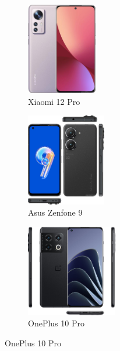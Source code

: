 \documentclass[10pt, UKenglish]{exam}
\begin{document}
\begin{figure}[htpb]
	\begin{subfigure}[htpb]{0.25\linewidth}
	\begin{center}
		\includegraphics[width=\linewidth,height=4cm,keepaspectratio]{xiaomi-12-pro}
	\end{center}
	\caption{Xiaomi 12 Pro}
	\label{fig:xiaomi-12-pro}
	\end{subfigure}
	\begin{subfigure}[htpb]{0.25\linewidth}
	\begin{center}
		\includegraphics[width=\linewidth,height=4cm,keepaspectratio]{asus-zenfone-9}
	\end{center}
	\caption{Asus Zenfone 9}
	\label{fig:asus-zenfone-9}
	\end{subfigure}
	\begin{subfigure}[htpb]{0.25\linewidth}
	\begin{center}
		\includegraphics[width=\linewidth,height=4cm,keepaspectratio]{oneplus-10-pro}
	\end{center}
	\caption{OnePlus 10 Pro}
	\label{fig:oneplus-10-pro}
	\end{subfigure}


\end{figure}
\end{document}
